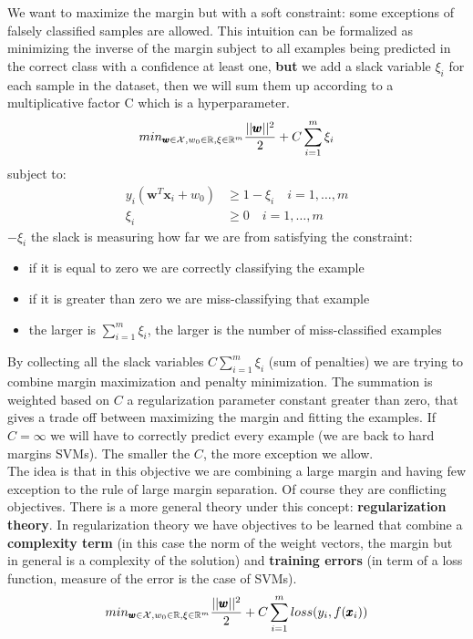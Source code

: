     We want to maximize the margin but with a soft constraint: some exceptions of falsely classified samples are allowed.
    This intuition can be formalized as minimizing the inverse of the margin subject to all examples being predicted in the correct class with a confidence at least one, \textbf{but} we add a slack variable $\xi_i$ for each sample in the dataset, then we will sum them up according to a multiplicative factor C which is a hyperparameter.
    $$min_{\pmb{w} \in \mathcal{X}, w_0 \in \mathbb{R}, \xi \in \mathbb{R}^m} \frac{||\pmb{w}||^2}{2} + C\sum_{i=1}^m \xi_i$$
    subject to: 
    \begin{align*}
        y_i(\pmb{w}^T \pmb{x}_i + w_0) &\geq 1 - \xi_i \quad i = 1, \dots, m\\
        \xi_i &\geq 0 \quad i = 1, \dots, m
    \end{align*}
    $- \xi_i$ the slack is measuring how far we are from satisfying the constraint:
    \begin{itemize}
        \item if it is equal to zero we are correctly classifying the example
        \item if it is greater than zero we are miss-classifying that example
        \item the larger is $\sum_{i=1}^m \xi_i$, the larger is the number of miss-classified examples
    \end{itemize}
    By collecting all the slack variables $C\sum_{i=1}^m \xi_i$ (sum of penalties) we are trying to combine margin maximization and penalty minimization. 
    The summation is weighted based on $C$ a regularization parameter constant greater than zero, that gives a trade off between maximizing the margin and fitting the examples. 
    If $C = \infty$ we will have to correctly predict every example (we are back to hard margins SVMs). The smaller the $C$, the more exception we allow.\\
    
    The idea is that in this objective we are combining a large margin and having few exception to the rule of large margin separation. 
    Of course they are conflicting objectives. 
    There is a more general theory under this concept: \textbf{regularization theory}. In regularization theory we have objectives to be learned that combine a \textbf{complexity term} (in this case the norm of the weight vectors, the margin but in general is a complexity of the solution) and \textbf{training errors} (in term of a loss function, measure of the error is the case of SVMs). 
    $$min_{\pmb{w} \in \mathcal{X}, w_0 \in \mathbb{R}, \xi \in \mathbb{R}^m} \frac{||\pmb{w}||^2}{2} + C\sum_{i=1}^m loss(y_i, f(\pmb{x}_i))$$

